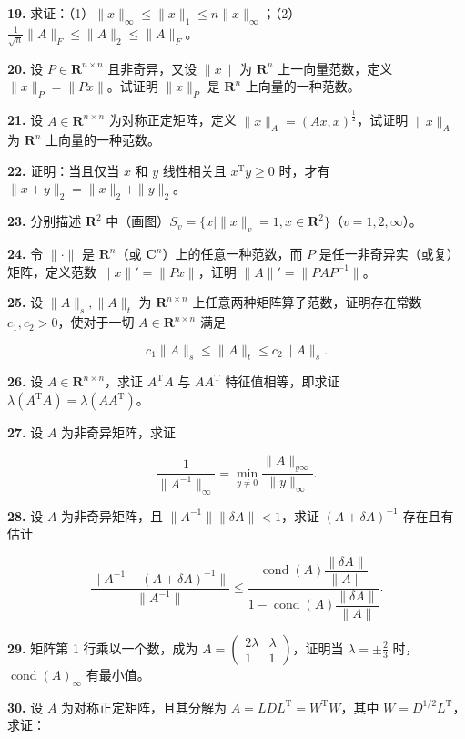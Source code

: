 \documentclass[
  10pt,
  fontset=fandol]{ctexart}
\begin{document}
\textbf{19.} 求证：（1）\(\|x\|_\infty\leqslant\|x\|_1\leqslant n\|x\|_\infty\)；（2）\(\frac1{\sqrt n}\|A\|_F\leqslant\|A\|_2\leqslant\|A\|_F\)。

\textbf{20.} 设 \(P\in\mathbf R^{n\times n}\) 且非奇异，又设 \(\|x\|\) 为 \(\mathbf R^n\) 上一向量范数，定义 \(\|x\|_P=\|Px\|\)。试证明 \(\|x\|_P\) 是 \(\mathbf R^n\) 上向量的一种范数。

\textbf{21.} 设 \(A\in\mathbf R^{n\times n}\) 为对称正定矩阵，定义 \(\|x\|_A=(Ax,x)^{\frac12}\)，试证明 \(\|x\|_A\) 为 \(\mathbf R^n\) 上向量的一种范数。

\textbf{22.} 证明：当且仅当 \(x\) 和 \(y\) 线性相关且 \(x^{\mathrm T}y\geqslant0\) 时，才有 \(\|x+y\|_2=\|x\|_2+\|y\|_2\)。

\textbf{23.} 分别描述 \(\mathbf R^2\) 中（画图）\(S_v=\{x\mid\|x\|_v=1,x\in\mathbf R^2\}\)（\(v=1,2,\infty\)）。

\textbf{24.} 令 \(\|\cdot\|\) 是 \(\mathbf R^n\)（或 \(\mathbf C^n\)）上的任意一种范数，而 \(P\) 是任一非奇异实（或复）矩阵，定义范数 \(\|x\|'=\|Px\|\)，证明 \(\|A\|'=\|PAP^{-1}\|\)。

\textbf{25.} 设 \(\|A\|_s,\|A\|_t\) 为 \(\mathbf R^{n\times n}\) 上任意两种矩阵算子范数，证明存在常数 \(c_1,c_2>0\)，使对于一切 \(A\in\mathbf R^{n\times n}\) 满足

\[
c_1\|A\|_s\leqslant\|A\|_t\leqslant c_2\|A\|_s.
\]

\textbf{26.} 设 \(A\in\mathbf R^{n\times n}\)，求证 \(A^{\mathrm T}A\) 与 \(AA^{\mathrm T}\) 特征值相等，即求证 \(\lambda(A^{\mathrm T}A)=\lambda(AA^{\mathrm T})\)。

\textbf{27.} 设 \(A\) 为非奇异矩阵，求证

\[
\frac1{\|A^{-1}\|_\infty}=\min_{y\neq0}\frac{\|A\|_{y\infty}}{\|y\|_\infty}.
\]

\textbf{28.} 设 \(A\) 为非奇异矩阵，且 \(\|A^{-1}\|\|\delta A\|<1\)，求证 \((A+\delta A)^{-1}\) 存在且有估计

\[
\frac{\|A^{-1}-(A+\delta A)^{-1}\|}{\|A^{-1}\|}
\leqslant
\frac{\operatorname{cond}(A)\dfrac{\|\delta A\|}{\|A\|}}
{1-\operatorname{cond}(A)\dfrac{\|\delta A\|}{\|A\|}}.
\]

\textbf{29.} 矩阵第 1 行乘以一个数，成为 \(A=\begin{pmatrix}2\lambda&\lambda\\1&1\end{pmatrix}\)，证明当 \(\lambda=\pm\frac23\) 时，\(\operatorname{cond}(A)_\infty\) 有最小值。

\textbf{30.} 设 \(A\) 为对称正定矩阵，且其分解为 \(A=LDL^{\mathrm T}=W^{\mathrm T}W\)，其中 \(W=D^{1/2}L^{\mathrm T}\)，求证：
\end{document}
